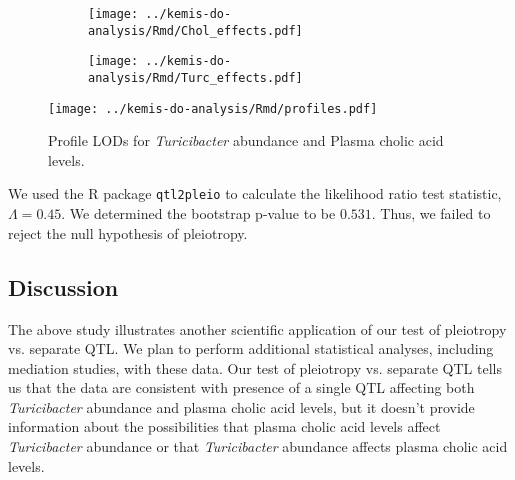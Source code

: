 \documentclass[oneside]{book}
\begin{document}
\begin{figure}

\begin{subfigure}[b]{\textwidth}
\centering
\texttt{[image: ../kemis-do-analysis/Rmd/Chol\_effects.pdf]}
\subcaption{}
\end{subfigure}

\begin{subfigure}[b]{\textwidth}
\centering
\texttt{[image: ../kemis-do-analysis/Rmd/Turc\_effects.pdf]}
\subcaption{}
\end{subfigure}
\caption{}
\end{figure}




\begin{figure}
\texttt{[image: ../kemis-do-analysis/Rmd/profiles.pdf]}
\caption{Profile LODs for \emph{Turicibacter} abundance and Plasma cholic acid levels.}
\end{figure}



We used the R package \texttt{qtl2pleio} \citep{qtl2pleio} to calculate the likelihood ratio test statistic, $\Lambda = 0.45$. We determined the bootstrap p-value to be $0.531$. Thus, we failed to reject the null hypothesis of pleiotropy.


\subsection{Discussion}

The above study illustrates another scientific application of our test of pleiotropy vs. separate QTL. We plan to perform additional statistical analyses, including mediation studies, with these data. Our test of pleiotropy vs. separate QTL tells us that the data are consistent with presence of a single QTL affecting both \emph{Turicibacter} abundance and plasma cholic acid levels, but it doesn't provide information about the possibilities that plasma cholic acid levels affect \emph{Turicibacter} abundance or that \emph{Turicibacter} abundance affects plasma cholic acid levels.
\end{document}
